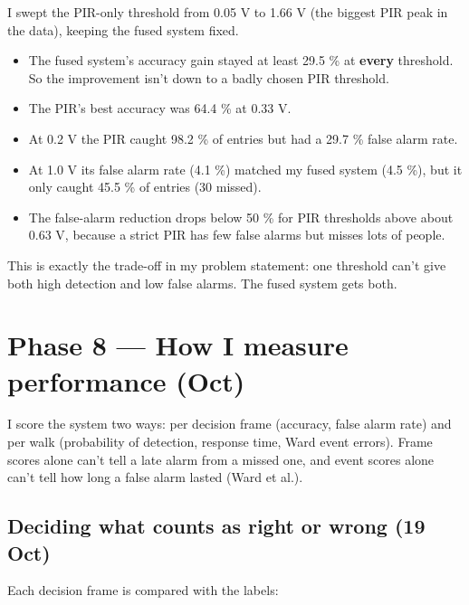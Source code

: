 \documentclass[11pt,a4paper]{article}
\providecommand{\tightlist}{\setlength{\itemsep}{0pt}\setlength{\parskip}{0pt}}
\begin{document}
I swept the PIR-only threshold
from 0.05 V to 1.66 V (the
biggest PIR peak in the data),
keeping the fused system
fixed.

\begin{itemize}
\tightlist
\item
  The fused system's accuracy
  gain stayed at least 29.5 \%
  at \textbf{every} threshold.
  So the improvement isn't
  down to a badly chosen PIR
  threshold.
\item
  The PIR's best accuracy was
  64.4 \% at 0.33 V.
\item
  At 0.2 V the PIR caught 98.2
  \% of entries but had a 29.7
  \% false alarm rate.
\item
  At 1.0 V its false alarm
  rate (4.1 \%) matched my
  fused system (4.5 \%), but
  it only caught 45.5 \% of
  entries (30 missed).
\item
  The false-alarm reduction
  drops below 50 \% for PIR
  thresholds above about 0.63
  V, because a strict PIR has
  few false alarms but misses
  lots of people.
\end{itemize}

This is exactly the trade-off
in my problem statement: one
threshold can't give both high
detection and low false
alarms. The fused system gets
both.

\hypertarget{phase-8-how-i-measure-performance-oct}{%
\section{Phase 8 --- How I
measure performance
(Oct)}\label{phase-8-how-i-measure-performance-oct}}

I score the system two ways:
per decision frame (accuracy,
false alarm rate) and per walk
(probability of detection,
response time, Ward event
errors). Frame scores alone
can't tell a late alarm from a
missed one, and event scores
alone can't tell how long a
false alarm lasted (Ward et
al.).

\hypertarget{deciding-what-counts-as-right-or-wrong-19-oct}{%
\subsection{Deciding what
counts as right or wrong (19
Oct)}\label{deciding-what-counts-as-right-or-wrong-19-oct}}

Each decision frame is
compared with the labels:
\end{document}
